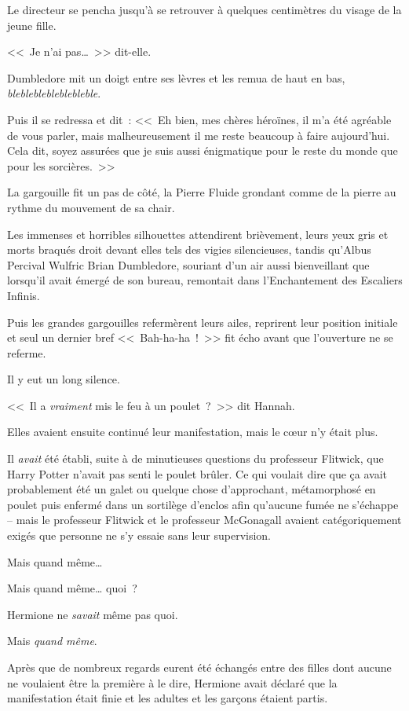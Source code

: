 Le directeur se pencha jusqu'à se retrouver à quelques centimètres du visage de la jeune fille.

<<~Je n'ai pas…~>> dit-elle.

Dumbledore mit un doigt entre ses lèvres et les remua de haut en bas, \emph{blebleblebleblebleble}.

Puis il se redressa et dit~: <<~Eh bien, mes chères héroïnes, il m'a été agréable de vous parler, mais malheureusement il me reste beaucoup à faire aujourd'hui. Cela dit, soyez assurées que je suis aussi énigmatique pour le reste du monde que pour les sorcières.~>>

La gargouille fit un pas de côté, la Pierre Fluide grondant comme de la pierre au rythme du mouvement de sa chair.

Les immenses et horribles silhouettes attendirent brièvement, leurs yeux gris et morts braqués droit devant elles tels des vigies silencieuses, tandis qu'Albus Percival Wulfric Brian Dumbledore, souriant d'un air aussi bienveillant que lorsqu'il avait émergé de son bureau, remontait dans l'Enchantement des Escaliers Infinis.

Puis les grandes gargouilles refermèrent leurs ailes, reprirent leur position initiale et seul un dernier bref <<~Bah-ha-ha~!~>> fit écho avant que l'ouverture ne se referme.

Il y eut un long silence.

<<~Il a \emph{vraiment} mis le feu à un poulet~?~>> dit Hannah.

\later

Elles avaient ensuite continué leur manifestation, mais le cœur n'y était plus.

Il \emph{avait} été établi, suite à de minutieuses questions du professeur Flitwick, que Harry Potter n'avait pas senti le poulet brûler. Ce qui voulait dire que ça avait probablement été un galet ou quelque chose d'approchant, métamorphosé en poulet puis enfermé dans un sortilège d'enclos afin qu'aucune fumée ne s'échappe -- mais le professeur Flitwick et le professeur McGonagall avaient catégoriquement exigés que personne ne s'y essaie sans leur supervision.

Mais quand même…

Mais quand même… quoi~?

Hermione ne \emph{savait} même pas quoi.

Mais \emph{quand même}.

Après que de nombreux regards eurent été échangés entre des filles dont aucune ne voulaient être la première à le dire, Hermione avait déclaré que la manifestation était finie et les adultes et les garçons étaient partis.

